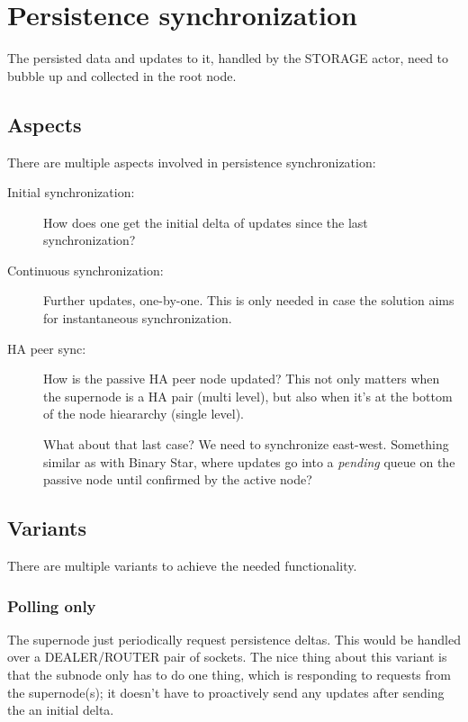 \section{Persistence synchronization}\label{sec:approach:psync}
The persisted data and updates to it, handled by the STORAGE actor, need to
bubble up and collected in the root node.

\subsection{Aspects}
There are multiple aspects involved in persistence synchronization:

\begin{description}
	\item [Initial synchronization:]
		How does one get the initial delta of updates since the last
		synchronization?

	\item [Continuous synchronization:]
		Further updates, one-by-one. This is only needed in
		case the solution aims for instantaneous synchronization.

	\item [HA peer sync:]
		How is the passive HA peer node updated?
		This not only matters when the supernode is a HA pair (multi
		level), but also when it's at the bottom of the node hieararchy
		(single level).

		\large\color{red} What about that last case? We need to synchronize
		east-west. Something similar as with Binary Star, where updates
		go into a \emph{pending} queue on the passive node until
		confirmed by the active node?
\end{description}

\subsection{Variants}
There are multiple variants to achieve the needed functionality.

\subsubsection{Polling only}
The supernode just periodically request persistence
deltas. This would be handled over a DEALER/ROUTER pair of sockets. The nice
thing about this variant is that the subnode only has to do one thing, which is
responding to requests from the supernode(s); it doesn't have to proactively
send any updates after sending the an initial delta.

